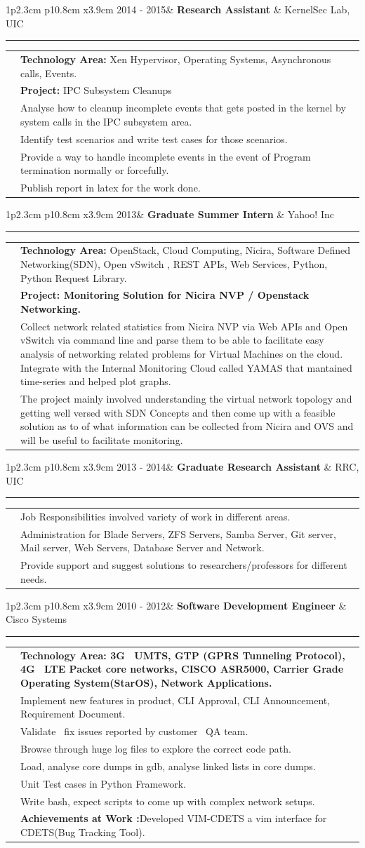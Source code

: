 \documentclass[10pt,A4]{article}
\newcommand{\tzlarrow}{(0,0) -- (0.2,0) -- (0.3,0.2) -- (0.2,0.4) -- (0,0.4) -- (0.1,0.2) -- cycle;}
\newcommand{\larrow}[1]
{\begin{tikzpicture}[scale=0.58]
	 \filldraw[fill=#1!100,draw=#1!100!black]  \tzlarrow
 \end{tikzpicture}
}
\newcommand{\cveventstart}[3]
{
\vspace{8pt}
	\begin{tabular*}{1\textwidth}{p{2.3cm}  p{10.8cm} x{3.9cm}}
 \textcolor{bgcol}{#1}& \textbf{#2} & \vspace{2.5pt}\textcolor{sectcol}{#3}

	\end{tabular*}
\vspace{-12pt}
\textcolor{softcol}{\hrule}
\vspace{6pt}
	\begin{tabular*}{1\textwidth}{p{2.3cm} p{14.4cm}}
}
\newcommand{\cveventi}[1]
{
&		 \larrow{bgcol}  #1\\[3pt]
}
\newcommand{\cveventend}
{
	\end{tabular*}
}
\begin{document}
\cveventstart{2014 - 2015}{Research Assistant}{KernelSec Lab, UIC}
\cveventi{\textbf{Technology Area:} Xen Hypervisor, Operating Systems, Asynchronous calls, Events.}
\cveventi{\textbf{Project:} IPC Subsystem Cleanups}
\cveventi{Analyse how to cleanup incomplete events that gets posted in the kernel by system calls in the IPC subsystem area.}
\cveventi{Identify test scenarios and write test cases for those scenarios.}
\cveventi{Provide a way to handle incomplete events in the event of Program termination normally or forcefully.}
\cveventi{Publish report in latex for the work done.}
\cveventend

%
\cveventstart{2013}{Graduate Summer Intern}{Yahoo! Inc}
\cveventi{\textbf{Technology Area:} OpenStack, Cloud Computing, Nicira, Software Defined Networking(SDN), Open vSwitch , REST APIs, Web Services, Python, Python Request Library.}
\cveventi{\textbf{Project: Monitoring Solution for Nicira NVP / Openstack Networking.}}
\cveventi{Collect network related statistics from Nicira NVP via Web APIs and Open vSwitch via command line and parse them to be able to facilitate easy analysis of networking related problems for Virtual Machines on the cloud. Integrate with the Internal Monitoring Cloud called YAMAS that mantained time-series and helped plot graphs.}
\cveventi{The project mainly involved understanding the virtual network topology and getting well versed with SDN Concepts and then come up with a feasible solution as to of what information can be collected from Nicira and OVS and will be useful to facilitate  monitoring.}
\cveventend

\newpage
\cveventstart{2013 - 2014}{Graduate Research Assistant}{RRC, UIC}
\cveventi{Job Responsibilities involved variety of work in different areas.}
\cveventi{Administration for Blade Servers, ZFS Servers, Samba Server, Git server, Mail server, Web Servers, Database Server and Network.}
\cveventi{Provide support and suggest solutions to researchers/professors for different needs.}
\cveventend

\cveventstart{2010 - 2012}{Software Development Engineer}{Cisco Systems}
\cveventi{\textbf{Technology Area: 3G \ UMTS, GTP (GPRS Tunneling Protocol), 4G \ LTE Packet core networks, CISCO ASR5000, Carrier Grade Operating System(StarOS), Network Applications.
}}
\cveventi{Implement new features in product, CLI Approval, CLI Announcement, Requirement Document.}
\cveventi{Validate \ fix issues reported by customer \ QA team.}
\cveventi{Browse through huge log files to explore the correct code path.}
\cveventi{Load, analyse core dumps in gdb, analyse linked lists in core dumps.}
\cveventi{Unit Test cases in Python Framework.}
\cveventi{Write bash, expect scripts to come up with complex network setups.}
\cveventi{\textbf{Achievements at Work :}Developed VIM-CDETS a vim interface for CDETS(Bug Tracking Tool).}
\cveventend
\end{document}
